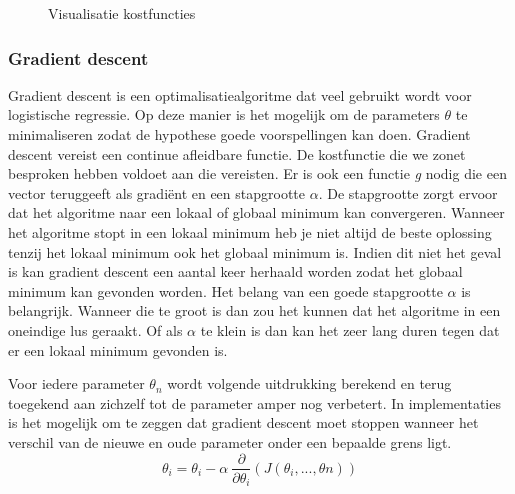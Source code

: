 \begin{figure}
	\centering
	\caption{Visualisatie kostfuncties}
	\label{fig:kostfunctie}
\end{figure}

\subsubsection{Gradient descent}
\label{sec:gradient-descent}
Gradient descent is een optimalisatiealgoritme dat veel gebruikt wordt voor logistische regressie. Op deze manier is het mogelijk om de parameters $\theta$ te minimaliseren zodat de hypothese goede voorspellingen kan doen.
Gradient descent vereist een continue afleidbare functie. De kostfunctie die we zonet besproken hebben voldoet aan die vereisten. Er is ook een functie \textit{g} nodig die een vector teruggeeft als gradiënt en een stapgrootte $\alpha$. De stapgrootte zorgt ervoor dat het algoritme naar een lokaal of globaal minimum kan convergeren. Wanneer het algoritme stopt in een lokaal minimum heb je niet altijd de beste oplossing tenzij het lokaal minimum ook het globaal minimum is. Indien dit niet het geval is kan gradient descent een aantal keer herhaald worden zodat het globaal minimum kan gevonden worden. Het belang van een goede stapgrootte $\alpha$ is belangrijk. Wanneer die te groot is dan zou het kunnen dat het algoritme in een oneindige lus geraakt. Of als $\alpha$ te klein is dan kan het zeer lang duren tegen dat er een lokaal minimum gevonden is. 

Voor iedere parameter $\theta_{n}$ wordt volgende uitdrukking berekend en terug toegekend aan zichzelf tot de parameter amper nog verbetert. In implementaties is het mogelijk om te zeggen dat gradient descent moet stoppen wanneer het verschil van de nieuwe en oude parameter onder een bepaalde grens ligt. 
$$
\theta_{i} = \theta_{i} - \alpha\:\frac{\partial}{\partial\theta_{i}}(J(\theta_{i}, ... , \theta{n}))
$$

